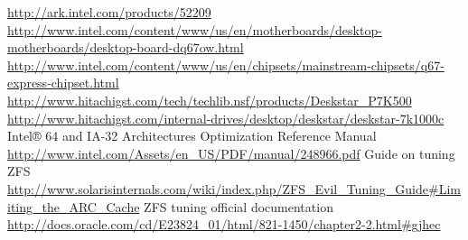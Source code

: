 {}
{}
\begin{thebibliography}{99}
 \url{http://ark.intel.com/products/52209}
 \url{http://www.intel.com/content/www/us/en/motherboards/desktop-motherboards/desktop-board-dq67ow.html}
 \url{http://www.intel.com/content/www/us/en/chipsets/mainstream-chipsets/q67-express-chipset.html}
 \url{http://www.hitachigst.com/tech/techlib.nsf/products/Deskstar_P7K500}
 \url{http://www.hitachigst.com/internal-drives/desktop/deskstar/deskstar-7k1000c}
 Intel® 64 and IA-32 Architectures Optimization Reference Manual \url{http://www.intel.com/Assets/en_US/PDF/manual/248966.pdf}
 Guide on tuning ZFS
\url{http://www.solarisinternals.com/wiki/index.php/ZFS\_Evil\_Tuning\_Guide#Limiting\_the\_ARC\_Cache}
 ZFS tuning official documentation
\url{http://docs.oracle.com/cd/E23824\_01/html/821-1450/chapter2-2.html#gjhec}
\end{thebibliography}
